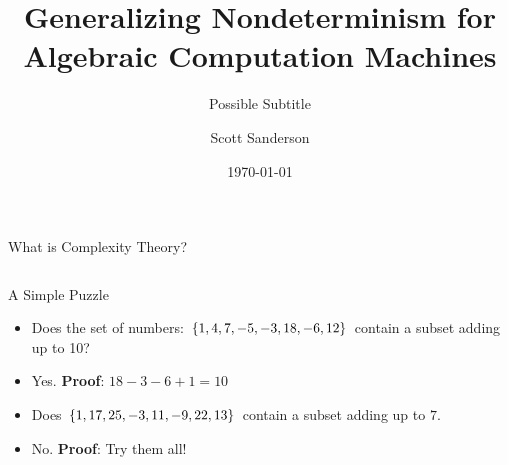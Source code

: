 \documentclass[c]{beamer}
\title{Generalizing Nondeterminism for Algebraic Computation Machines}
\subtitle{Possible Subtitle}
\author{Scott Sanderson}
\institute{Department of Mathematics\\Williams College}
\date{\today}
\begin{document}
\theoremstyle{definition}
\newtheorem{proposition}{Proposition}
\newtheorem{proofidea}{Proof Idea}

\begin{frame}
  \titlepage
\end{frame}

\begin{frame}{What is Complexity Theory?}
  
  \begin{columns}
  \end{columns}

\end{frame}

\begin{frame}{A Simple Puzzle}
  
  \begin{itemize}
  \item Does the set of numbers: $\{1,4,7,-5,-3,18,-6,12\}$ contain
    a subset adding up to 10? \pause
  \item Yes.  \textbf{Proof}: $18 - 3 - 6 + 1 = 10$ \pause
  \item Does $\{1, 17, 25, -3, 11, -9, 22, 13\}$ contain a subset
    adding up to $7$.\pause
  \item No.  \textbf{Proof}: Try them all! 
  \end{itemize}
  
\end{frame}
\end{document}
